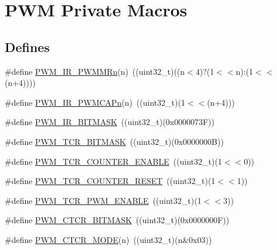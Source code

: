 \hypertarget{group___p_w_m___private___macros}{\section{\-P\-W\-M \-Private \-Macros}
\label{group___p_w_m___private___macros}
}
\subsection*{\-Defines}
\begin{DoxyCompactItemize}
\item 
\#define \hyperlink{group___p_w_m___private___macros_ga1b6715e8b144b5668046847dcaa90f1c}{\-P\-W\-M\-\_\-\-I\-R\-\_\-\-P\-W\-M\-M\-Rn}(n)~((uint32\-\_\-t)((n$<$4)?(1$<$$<$n)\-:(1$<$$<$(n+4))))
\item 
\#define \hyperlink{group___p_w_m___private___macros_gaa3c2c679c9d822d0abbe8170bc29b16b}{\-P\-W\-M\-\_\-\-I\-R\-\_\-\-P\-W\-M\-C\-A\-Pn}(n)~((uint32\-\_\-t)(1$<$$<$(n+4)))
\item 
\#define \hyperlink{group___p_w_m___private___macros_ga97403bed71389ae3170c0d8ab2e24ff0}{\-P\-W\-M\-\_\-\-I\-R\-\_\-\-B\-I\-T\-M\-A\-S\-K}~((uint32\-\_\-t)(0x0000073\-F))
\item 
\#define \hyperlink{group___p_w_m___private___macros_gacbff39676b66738d01e22d4ab51c7fdf}{\-P\-W\-M\-\_\-\-T\-C\-R\-\_\-\-B\-I\-T\-M\-A\-S\-K}~((uint32\-\_\-t)(0x0000000\-B))
\item 
\#define \hyperlink{group___p_w_m___private___macros_ga259cdad22a8111638bb0bff771acb9f4}{\-P\-W\-M\-\_\-\-T\-C\-R\-\_\-\-C\-O\-U\-N\-T\-E\-R\-\_\-\-E\-N\-A\-B\-L\-E}~((uint32\-\_\-t)(1$<$$<$0))
\item 
\#define \hyperlink{group___p_w_m___private___macros_gaa15c51bb0d40f2f97c2853e8bba53ca5}{\-P\-W\-M\-\_\-\-T\-C\-R\-\_\-\-C\-O\-U\-N\-T\-E\-R\-\_\-\-R\-E\-S\-E\-T}~((uint32\-\_\-t)(1$<$$<$1))
\item 
\#define \hyperlink{group___p_w_m___private___macros_gaddf3dbda81300db70799898d12a72431}{\-P\-W\-M\-\_\-\-T\-C\-R\-\_\-\-P\-W\-M\-\_\-\-E\-N\-A\-B\-L\-E}~((uint32\-\_\-t)(1$<$$<$3))
\item 
\#define \hyperlink{group___p_w_m___private___macros_gae704c4d93805d46927cbb07cb4e8fa66}{\-P\-W\-M\-\_\-\-C\-T\-C\-R\-\_\-\-B\-I\-T\-M\-A\-S\-K}~((uint32\-\_\-t)(0x0000000\-F))
\item 
\#define \hyperlink{group___p_w_m___private___macros_ga66cd3dc2d3ed2c71406d7c3fd1df153d}{\-P\-W\-M\-\_\-\-C\-T\-C\-R\-\_\-\-M\-O\-D\-E}(n)~((uint32\-\_\-t)(n\&0x03))

\end{DoxyCompactItemize}
